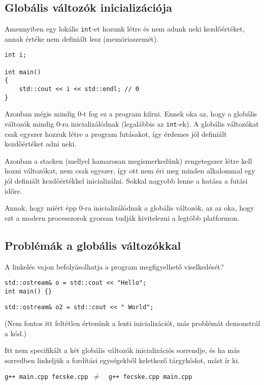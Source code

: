 \documentclass[../cpp_book/cpp_book.tex]{subfiles}
\begin{document}
	\subsection{Globális változók inicializációja}
	Amennyiben egy lokális \texttt{int}-et hozunk létre és nem adunk neki kezdőértéket, annak értéke nem definiált lesz (memóriaszemét).
	\begin{lstlisting}
int i;

int main() 
{
	std::cout << i << std::endl; // 0
}
	\end{lstlisting}   
	Azonban mégis mindig 0-t fog ez a program kiírni. Ennek oka az, hogy a globális változók mindig 0-ra inicializálódnak (legalábbis az \texttt{int}-ek). A globális változókat csak egyszer hozzuk létre a program futásakot, így érdemes jól definiált kezdőértéket adni neki.
	
	Azonban a stacken (mellyel hamarosan megismerkedünk) rengetegszer létre kell hozni változókat, nem csak egyszer, így ott nem éri meg minden alkalommal egy jól definiált kezdőértékkel inicializálni. Sokkal nagyobb lenne a hatása a futási időre.
	
	Annak, hogy miért épp 0-ra inicializálódnak a globális változók, az az oka, hogy ezt a modern processzorok gyorsan tudják kivitelezni a legtöbb platformon. 
	\subsection{Problémák a globális változókkal}
	
	A linkelés vajon befolyásolhatja a program megfigyelhető viselkedését?
	\bigskip
	
	\begin{lstlisting}
std::ostream& o = std::cout << "Hello";
int main() {}
	\end{lstlisting}
	\bigskip
	
	\begin{lstlisting}
std::ostream& o2 = std::cout << " World";
	\end{lstlisting}
	(Nem fontos itt feltétlen értenünk a lenti inicializációt, más problémát demonstrál a kód.)
	
	Itt nem specifikált a két globális változók inicializációs sorrendje, és ha más sorredben linkeljük a fordítási egységekből keletkező tárgykódot, mást ír ki.
	
	{\centering \texttt{g++ main.cpp fecske.cpp \quad $\not=$\quad\, g++ fecske.cpp main.cpp} \par}
	
\end{document}
